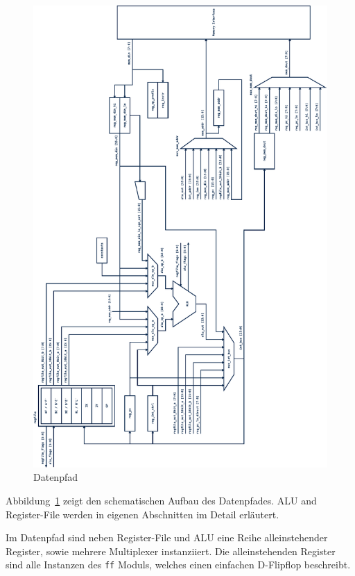 \documentclass[ngerman, cd=lightcolor]{tudscrreprt}
\begin{document}
\begin{figure}[htbp]
  \centering
    \includegraphics[height=\textheight]{resources/pdf/datapath.pdf}
  \caption{Datenpfad}
  \label{img:data-path}
\end{figure}

Abbildung~\ref{img:data-path} zeigt den schematischen Aufbau des Datenpfades.
ALU and Register-File werden in eigenen Abschnitten im Detail erläutert.

Im Datenpfad sind neben Register-File und ALU eine Reihe alleinstehender
Register, sowie mehrere Multiplexer instanziiert. Die alleinstehenden Register
sind alle Instanzen des \texttt{ff} Moduls, welches einen einfachen D-Flipflop
beschreibt.
\end{document}
